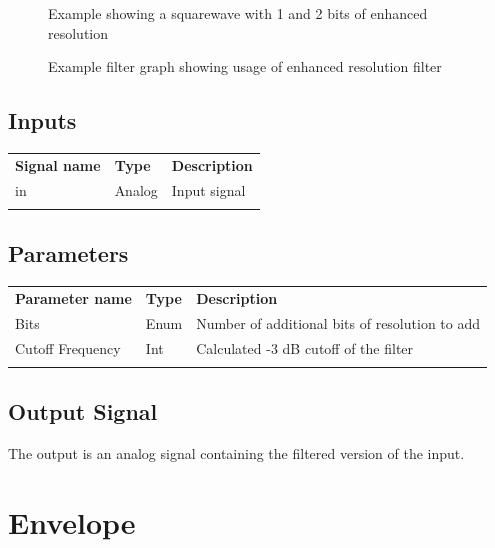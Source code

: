 \begin{figure}[h]
\centering
{}
\caption{Example showing a squarewave with 1 and 2 bits of enhanced resolution}
\label{filter_eres}
\end{figure}

\begin{figure}[h]
\centering
{}
\caption{Example filter graph showing usage of enhanced resolution filter}
\label{filter_graph_eres}
\end{figure}

\FloatBarrier

\subsection{Inputs}

\begin{tabularx}{16cm}{llX}
\thickhline
\textbf{Signal name} & \textbf{Type} & \textbf{Description} \\
\thickhline
in & Analog & Input signal\\
\thickhline
\end{tabularx}

\subsection{Parameters}

\begin{tabularx}{16cm}{llX}
\thickhline
\textbf{Parameter name} & \textbf{Type} & \textbf{Description} \\
\thickhline
Bits & Enum & Number of additional bits of resolution to add\\
\thinhline
Cutoff Frequency & Int & Calculated -3 dB cutoff of the filter\\
\thickhline
\end{tabularx}

\subsection{Output Signal}

The output is an analog signal containing the filtered version of the input.

\pagebreak
\section{Envelope}
\label{filter:envelope}


